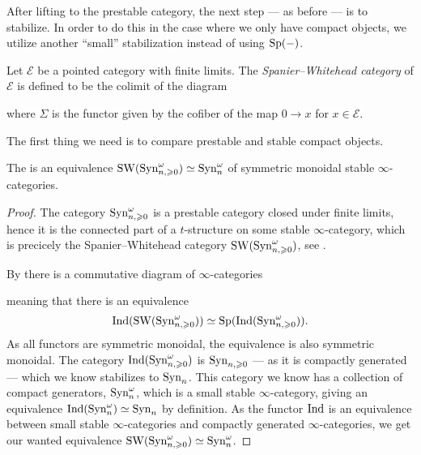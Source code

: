 After lifting to the prestable category, the next step --- as before --- is to stabilize. In order to do this in the case where we only have compact objects, we utilize another ``small'' stabilization instead of using $\mathrm{Sp}(-)$. 

\begin{definition}
    Let $\mathcal{E}$ be a pointed category with finite limits. The \emph{Spanier--Whitehead category} of $\mathcal{E}$ is defined to be the colimit of the diagram 
    \begin{center}
    \end{center}
    where $\Sigma$ is the functor given by the cofiber of the map $0\rightarrow x$ for $x\in \mathcal{E}$. 
\end{definition}

The first thing we need is to compare prestable and stable compact objects. 

\begin{theorem}
    \label{ch3:add:thm:prestable-freyd-stabilizes-to-stable-Freyd}
    The is an equivalence $\operatorname{SW}(\mathrm{Syn}_{n, \geqslant 0}^\omega)\simeq \mathrm{Syn}_{n}^\omega$ of symmetric monoidal stable $\infty$-categories.  
\end{theorem}
\begin{proof}
    The category $\mathrm{Syn}_{n, \geqslant 0}^\omega$ is a prestable category closed under finite limits, hence it is the connected part of a $t$-structure on some stable $\infty$-category, which is precicely the Spanier--Whitehead category $\operatorname{SW}(\mathrm{Syn}_{n, \geqslant 0}^\omega)$, see \cite[C.1.1, C.1.2]{lurie_SAG}. 

    By \cite[C.1.1.6]{lurie_SAG} there is a commutative diagram of $\infty$-categories
    \begin{center}
    \end{center}
    meaning that there is an equivalence
    \[\operatorname{Ind}(\operatorname{SW}(\mathrm{Syn}_{n, \geqslant 0}^\omega))\simeq \mathrm{Sp}(\operatorname{Ind}(\mathrm{Syn}_{n, \geqslant 0}^\omega)).\]
    As all functors are symmetric monoidal, the equivalence is also symmetric monoidal. The category $\operatorname{Ind}(\mathrm{Syn}_{n, \geqslant 0}^\omega)$ is $\mathrm{Syn}_{n, \geqslant 0}$ --- as it is compactly generated --- which we know stabilizes to $\mathrm{Syn}_{n}$. This category we know has a collection of compact generators, $\mathrm{Syn}_{n}^\omega$, which is a small stable $\infty$-category, giving an equivalence $\operatorname{Ind}(\mathrm{Syn}_{n}^\omega)\simeq \mathrm{Syn}_{n}$ by definition. As the functor $\operatorname{Ind}$ is an equivalence between small stable $\infty$-categories and compactly generated $\infty$-categories, we get our wanted equivalence $\operatorname{SW}(\mathrm{Syn}_{n, \geqslant 0}^\omega)\simeq \mathrm{Syn}_{n}^\omega$. 
\end{proof}

